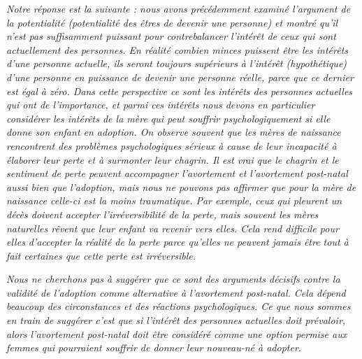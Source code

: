 \begin{displayquote}
\emph{Notre réponse est la suivante : nous avons précédemment examiné l'argument de la potentialité (potentialité des êtres de devenir une personne) et montré qu'il n'est pas suffisamment puissant pour contrebalancer l'intérêt de ceux qui sont actuellement des personnes. En réalité combien minces puissent être les intérêts d'une personne actuelle, ils seront toujours supérieurs à l'intérêt (hypothétique) d'une personne en puissance de devenir une personne réelle, parce que ce dernier est égal à zéro. Dans cette perspective ce sont les intérêts des personnes actuelles qui ont de l'importance, et parmi ces intérêts nous devons en particulier considérer les intérêts de la mère qui peut souffrir psychologiquement si elle donne son enfant en adoption. On observe souvent que les mères de naissance rencontrent des problèmes psychologiques sérieux à cause de leur incapacité à élaborer leur perte et à surmonter leur chagrin. Il est vrai que le chagrin et le sentiment de perte peuvent accompagner l'avortement et l'avortement post-natal aussi bien que l'adoption, mais nous ne pouvons pas affirmer que pour la mère de naissance celle-ci est la moins traumatique. Par exemple, ceux qui pleurent un décès doivent accepter l'irréversibilité de la perte, mais souvent les mères naturelles rêvent que leur enfant va revenir vers elles. Cela rend difficile pour elles d'accepter la réalité de la perte parce qu'elles ne peuvent jamais être tout à fait certaines que cette perte est irréversible.}

\emph{Nous ne cherchons pas à suggérer que ce sont des arguments décisifs contre la validité de l'adoption comme alternative à l'avortement post-natal. Cela dépend beaucoup des circonstances et des réactions psychologiques. Ce que nous sommes en train de suggérer c'est que si l'intérêt des personnes actuelles doit prévaloir, alors l'avortement post-natal doit être considéré comme une option permise aux femmes qui pourraient souffrir de donner leur nouveau-né à adopter.}
\end{displayquote}


